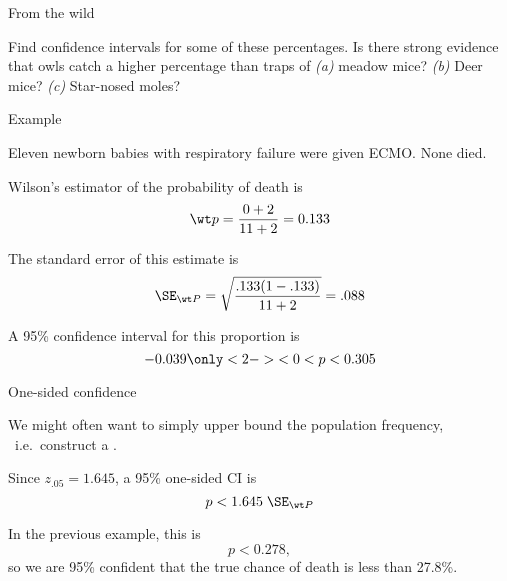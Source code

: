 \begin{frame}{From the wild}

    \begin{center}
    \end{center}

    \vspace{2em}

    Find confidence intervals for some of these percentages.  
    Is there strong evidence that owls catch a higher percentage than traps of 
    \textit{(a)} meadow mice?
    \textit{(b)} Deer mice?
    \textit{(c)} Star-nosed moles?


\end{frame}

\begin{frame}{Example}

    Eleven newborn babies with respiratory failure were given ECMO.  None died.

    \vspace{2em}

    \alert{Wilson's estimator} of the probability of death is
    \[ \wt p = \frac{0+2}{11+2} = 0.133 \]

    \vspace{2em}

    The \alert{standard error} of this estimate is
    \[ \SE_{\wt P} = \sqrt{\frac{ .133(1-.133) }{ 11+2 }} = .088 \]

    \vspace{2em}

    A \alert{95\% confidence interval} for this proportion is
        \[ -0.039 \only<2->{ < 0 }< p < 0.305 \]


\end{frame}

\begin{frame}{One-sided confidence}

    We might often want to simply \alert{upper bound} the population frequency,\\\
    i.e.\ construct a .

    \vspace{2em}

    Since $z_{.05} = 1.645$, 
    a \alert{95\% one-sided CI} is 
        \[ p < 1.645 \; \SE_{\wt P} \]

    \vspace{2em}

    In the previous example, this is
        \[ p < 0.278 , \]
    so we are 95\% confident that the true chance of death is less than 27.8\%.


\end{frame}

